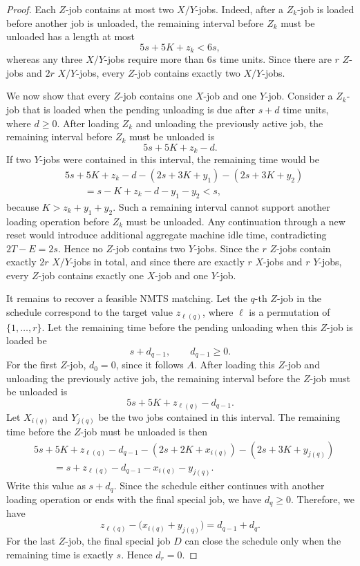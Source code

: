 \documentclass[11pt]{article}
\begin{document}
\begin{proof}
Each \(Z\)-job contains at most two \(X/Y\)-jobs. Indeed, after a \(Z_k\)-job is loaded
before another job is unloaded, the remaining interval before \(Z_k\) must be unloaded
has a length at most
\[
5s+5K+z_k<6s,
\]
whereas any three \(X/Y\)-jobs require more than \(6s\) time units. Since there are
\(r\) \(Z\)-jobs and \(2r\) \(X/Y\)-jobs, every \(Z\)-job contains exactly two \(X/Y\)-jobs.

We now show that every \(Z\)-job contains one \(X\)-job and one \(Y\)-job. Consider a
\(Z_k\)-job that is loaded when the pending unloading is due after \(s+d\) time units,
where \(d\ge0\). After loading \(Z_k\) and unloading the previously active job, the
remaining interval before \(Z_k\) must be unloaded is
\[
5s+5K+z_k-d.
\]
If two \(Y\)-jobs were contained in this interval, the remaining time would be
\[
\begin{aligned}
&5s+5K+z_k-d
-(2s+3K+y_1)
-(2s+3K+y_2) \\
&\qquad =
s-K+z_k-d-y_1-y_2
<s,
\end{aligned}
\]
because \(K>z_k+y_1+y_2\). Such a remaining interval cannot support another loading
operation before \(Z_k\) must be unloaded. Any continuation through a new reset would
introduce additional aggregate machine idle time, contradicting \(2T-E=2s\). Hence no
\(Z\)-job contains two \(Y\)-jobs.
Since the \(r\) \(Z\)-jobs contain exactly \(2r\) \(X/Y\)-jobs in total, and since there
are exactly \(r\) \(X\)-jobs and \(r\) \(Y\)-jobs, every \(Z\)-job contains exactly one
\(X\)-job and one \(Y\)-job.

It remains to recover a feasible NMTS matching. Let the \(q\)-th \(Z\)-job in the
schedule correspond to the target value \(z_{\ell(q)}\), where \(\ell\) is a permutation of
\(\{1,\ldots,r\}\). Let the remaining time before the pending unloading when this
\(Z\)-job is loaded be
\[
s+d_{q-1},
\qquad d_{q-1}\ge0.
\]
For the first \(Z\)-job, \(d_0=0\), since it follows \(A\). After loading this \(Z\)-job
and unloading the previously active job, the remaining interval before the \(Z\)-job
must be unloaded is
\[
5s+5K+z_{\ell(q)}-d_{q-1}.
\]
Let \(X_{i(q)}\) and \(Y_{j(q)}\) be the two jobs contained in this interval. The
remaining time before the \(Z\)-job must be unloaded is then
\[
\begin{aligned}
&5s+5K+z_{\ell(q)}-d_{q-1}
-(2s+2K+x_{i(q)})
-(2s+3K+y_{j(q)}) \\
&\qquad =
s+z_{\ell(q)}-d_{q-1}-x_{i(q)}-y_{j(q)}.
\end{aligned}
\]
Write this value as \(s+d_q\). Since the schedule either continues with another loading
operation or ends with the final special job, we have \(d_q\ge0\). Therefore, we have 
\[
z_{\ell(q)}-\bigl(x_{i(q)}+y_{j(q)}\bigr)=d_{q-1}+d_q.
\]
For the last \(Z\)-job, the final special job \(D\) can close the schedule only when the
remaining time is exactly \(s\). Hence \(d_r=0\).


\end{proof}
\end{document}
